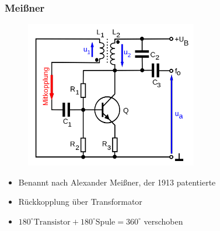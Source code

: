 \begin{frame}
  \frametitle{Meißner}
  \begin{center}
    \begin{figure}
      \includegraphics[width=0.67\textwidth,height=.5\textheight,keepaspectratio]{a07/Meissner_oszi.png}
    \end{figure}
    \begin{itemize}
      \item Benannt nach Alexander Meißner, der 1913 patentierte
      \item Rückkopplung über Transformator
      \item $180^{\circ} \text{Transistor} + 180^{\circ} \text{Spule} = 360^{\circ}$ verschoben
    \end{itemize}
  \end{center}
\end{frame}

